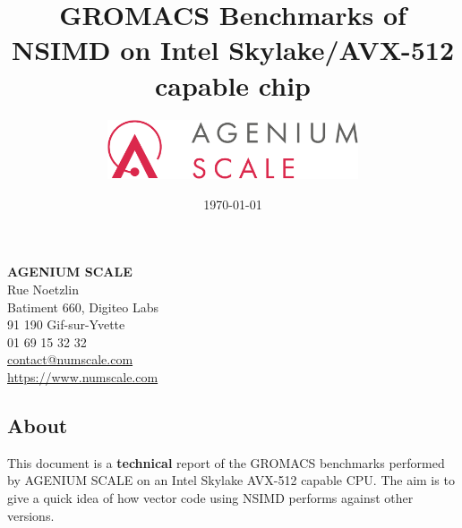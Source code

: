 \documentclass[a4paper,11pt]{article}
\date{\today}
\author{\includegraphics[width=20em]{logo_agenium_scale}}
\title{GROMACS Benchmarks of NSIMD on Intel Skylake/AVX-512 capable chip}
\newcommand{\gromacs}{GROMACS}
\newcommand{\nsimd}{NSIMD}
\newcommand{\cpu}{CPU}
\newcommand{\ageniumscale}{AGENIUM SCALE}
\begin{document}
\maketitle%
\vspace*{\fill}%
\noindent%
\textbf{\ageniumscale{}}\\
Rue Noetzlin\\
Batiment 660, Digiteo Labs\\
91 190 Gif-sur-Yvette\\
01 69 15 32 32\\
\href{mailto://contact@numscale.com}{contact@numscale.com}\\
\href{https://www.numscale.com}{https://www.numscale.com}\\
\thispagestyle{empty}
\clearpage
%
\thispagestyle{empty}
\tableofcontents
\newpage

\subsection*{About}%
\label{sec:about}

This document is a \textbf{technical} report of the \gromacs{} benchmarks performed by \ageniumscale{} on an Intel Skylake AVX-512 capable \cpu. The aim is to give a quick idea of how vector code using \nsimd{} performs against other versions.
\end{document}
